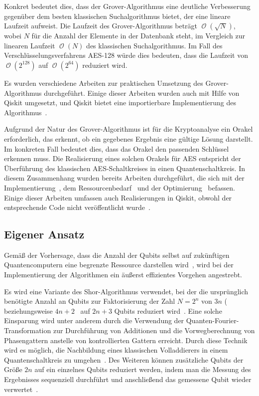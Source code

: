 \documentclass[a4paper,journal]{IEEEtran}
\DeclareMathOperator{\Landau}{\mathcal{O}} %
\begin{document}
Konkret bedeutet dies,
dass der Grover-Algorithmus eine deutliche Verbesserung gegenüber dem besten klassischen Suchalgorithmus bietet,
der eine lineare Laufzeit aufweist.
Die Laufzeit des Grover-Algorithmus beträgt \(\Landau(\sqrt N)\),
wobei \(N\) für die Anzahl der Elemente in der Datenbank steht,
im Vergleich zur linearen Laufzeit \(\Landau(N)\) des klassischen Suchalgorithmus.
Im Fall des Verschlüsselungsverfahrens AES-128 würde dies bedeuten,
dass die Laufzeit von \(\Landau(2^{128})\) auf \(\Landau(2^{64})\) reduziert wird.

Es wurden verschiedene Arbeiten zur praktischen Umsetzung des Grover-Algorithmus durchgeführt.
Einige dieser Arbeiten wurden auch mit Hilfe von Qiskit umgesetzt,
und Qiskit bietet eine importierbare Implementierung des Algorithmus~\cite{IBM:Grover}.

Aufgrund der Natur des Grover-Algorithmus ist für die Kryptoanalyse ein Orakel erforderlich,
das erkennt, ob ein gegebenes Ergebnis eine gültige Lösung darstellt.
Im konkreten Fall bedeutet dies, dass das Orakel den passenden Schlüssel erkennen muss.
Die Realisierung eines solchen Orakels für AES
entspricht der Überführung des klassischen AES-Schaltkreises in einen Quantenschaltkreis.
In diesem Zusammenhang wurden bereits Arbeiten durchgeführt,
die sich mit der Implementierung~\cite{jaques2019implementing},
dem Ressourcenbedarf~\cite{grassl2015applying} und der Optimierung~\cite{Li2022} befassen.
Einige dieser Arbeiten umfassen auch Realisierungen in Qiskit,
obwohl der entsprechende Code nicht veröffentlicht wurde~\cite{app11199085}.


\subsection{Eigener Ansatz}

Gemäß der Vorhersage, dass die Anzahl der Qubits
selbst auf zukünftigen Quantencomputern eine begrenzte Ressource darstellen wird~\cite{zalka1998fast},
wird bei der Implementierung der Algorithmen ein äußerst effizientes Vorgehen angestrebt.

Es wird eine Variante des Shor-Algorithmus verwendet,
bei der die ursprünglich benötigte Anzahl an Qubits zur Faktorisierung der Zahl
\(N = 2^{n}\) von \(3n\) (~\cite{zalka1998fast} beziehungsweise
\(4n+2\)~\cite{IBM:Shor_docu} auf \(2n+3\) Qubits reduziert wird~\cite{beauregard2003circuit}.
Eine solche Einsparung wird unter anderem durch
die Verwendung der Quanten-Fourier-Transformation zur Durchführung von Additionen und
die Vorwegberechnung von Phasengattern anstelle von kontrollierten Gattern erreicht.
Durch diese Technik wird es möglich,
die Nachbildung eines klassischen Volladdierers in einem Quantenschaltkreis zu umgehen~\cite{draper2000addition}.
Des Weiteren können zusätzliche Qubits der Größe \(2n\) auf ein einzelnes Qubits reduziert werden,
indem man die Messung des Ergebnisses sequenziell durchführt und anschließend das gemessene Qubit wieder verwertet~\cite{Parker_2000}.
\end{document}
